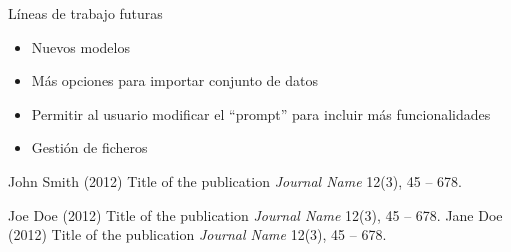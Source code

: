 \documentclass[aspectratio=169,xcolor=dvipsnames, t]{beamer}
\begin{document}
\begin{frame}{Líneas de trabajo futuras}
    \begin{itemize}
        \item Nuevos modelos
        \item Más opciones para importar conjunto de datos
        \item Permitir al usuario modificar el ``{prompt}'' para incluir más funcionalidades
        \item Gestión de ficheros
    \end{itemize}
\end{frame}

\begin{frame}{}
    \footnotesize{
        \begin{thebibliography}{99}
             John Smith (2012)
            \newblock Title of the publication
            \newblock \emph{Journal Name} 12(3), 45 -- 678.

             Joe Doe (2012)
            \newblock Title of the publication
            \newblock \emph{Journal Name} 12(3), 45 -- 678.
             Jane Doe (2012)
            \newblock Title of the publication
            \newblock \emph{Journal Name} 12(3), 45 -- 678.
        \end{thebibliography}
    }
\end{frame}

\makefinalpage
\end{document}
